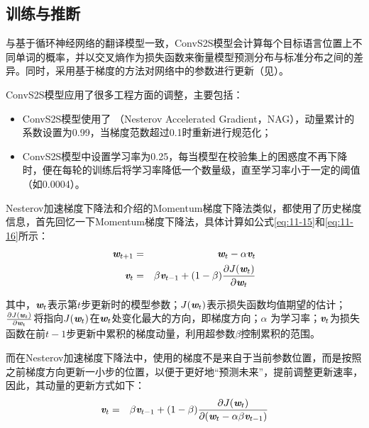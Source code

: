 \subsection{训练与推断}

\parinterval 与基于循环神经网络的翻译模型一致，ConvS2S模型会计算每个目标语言位置上不同单词的概率，并以交叉熵作为损失函数来衡量模型预测分布与标准分布之间的差异。同时，采用基于梯度的方法对网络中的参数进行更新（见{\chapternine}）。

\parinterval ConvS2S模型应用了很多工程方面的调整，主要包括：
\begin{itemize}
\vspace{0.5em}
\item ConvS2S模型使用了{\small{}} （Nesterov Accelerated Gradient，NAG），动量累计的系数设置为0.99，当梯度范数超过0.1时重新进行规范化；

\vspace{0.5em}
\item ConvS2S模型中设置学习率为0.25，每当模型在校验集上的困惑度不再下降时，便在每轮的训练后将学习率降低一个数量级，直至学习率小于一定的阈值（如0.0004）。
\vspace{0.5em}

\end{itemize}

\parinterval Nesterov加速梯度下降法和{\chapternine}介绍的Momentum梯度下降法类似，都使用了历史梯度信息，首先回忆一下Momentum梯度下降法，具体计算如公式\eqref{eq:11-15}和\eqref{eq:11-16}所示：
\begin{eqnarray}
\textbf{\em w}_{t+1} & = &  \textbf{\em w}_t - \alpha \textbf{\em v}_t \label{eq:11-15} \\
\textbf{\em v}_t & = & \beta \textbf{\em v}_{t-1} + (1-\beta)\frac{\partial J(\textbf{\em w}_t)}{\partial \textbf{\em w}_t}  \label{eq:11-16}
\end{eqnarray}

\noindent 其中，$\textbf{\em w}_t$表示第$t$步更新时的模型参数；$J(\textbf{\em w}_t)$表示损失函数均值期望的估计；$\frac{\partial J(\textbf{\em w}_t)}{\partial \textbf{\em w}_t}$将指向$J(\textbf{\em w}_t)$在$\textbf{\em w}_t$处变化最大的方向，即梯度方向；$\alpha$ 为学习率；$\textbf{\em v}_t$为损失函数在前$t-1$步更新中累积的梯度动量，利用超参数$\beta$控制累积的范围。

\parinterval 而在Nesterov加速梯度下降法中，使用的梯度不是来自于当前参数位置，而是按照之前梯度方向更新一小步的位置，以便于更好地“预测未来”，提前调整更新速率，因此，其动量的更新方式如下：
\begin{eqnarray}
\textbf{\em v}_t & = & \beta \textbf{\em v}_{t-1} + (1-\beta)\frac{\partial J(\textbf{\em w}_t)}{\partial (\textbf{\em w}_{t} -\alpha \beta \textbf{\em v}_{t-1} )}
\label{eq:11-17}
\end{eqnarray}

